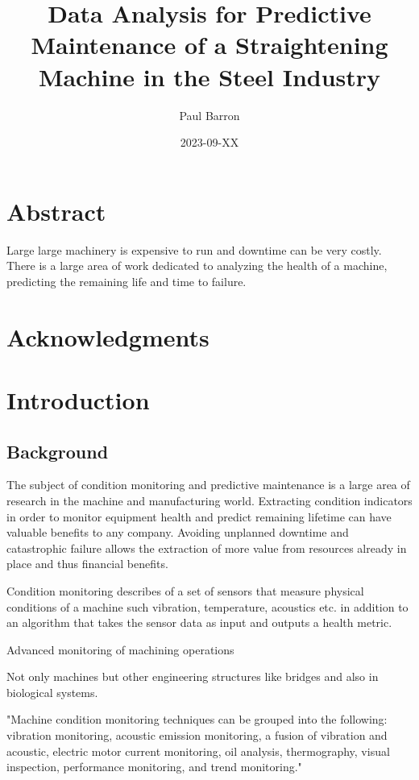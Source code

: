 \documentclass{article}
\title{Data Analysis for Predictive Maintenance of a Straightening Machine in the Steel Industry}
\date{2023-09-XX}
\author{Paul Barron}
\begin{document}
\maketitle
\newpage
{}
\tableofcontents
\newpage
\section{Abstract}
Large large machinery is expensive to run and downtime can be very costly. There is a large area of work dedicated to analyzing the health of a machine, predicting the remaining life and time to failure.
\clearpage
\section{Acknowledgments}
\clearpage
\section{Introduction}
\subsection{Background}
The subject of condition monitoring and predictive maintenance is a large area of research in the machine and manufacturing world. Extracting condition indicators in order to monitor equipment health and predict remaining lifetime can have valuable benefits to any company. Avoiding unplanned downtime and catastrophic failure allows the extraction of more value from resources already in place and thus financial benefits.

Condition monitoring describes of a set of sensors that measure physical conditions of a machine such vibration, temperature, acoustics etc. in addition to an algorithm that takes the sensor data as input and outputs a health metric.

Advanced monitoring of machining operations~\cite{teti2010advanced}

Not only machines but other engineering structures like bridges and also in biological systems.

"Machine condition monitoring techniques can be grouped into the following: vibration monitoring, acoustic emission monitoring, a fusion of vibration and acoustic, electric motor current monitoring, oil analysis, thermography, visual inspection, performance monitoring, and trend monitoring."
\end{document}
